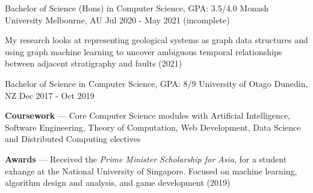 
\begin{cventries}
  \cventry
    {Bachelor of Science (Hons) in Computer Science, GPA: 3.5/4.0} %
    {Monash University} %
    {Melbourne, AU} %
    {Jul 2020 - May 2021 (incomplete)} %
    {
      \begin{cvitems} %
         \item {My research looks at representing geological systems as graph data structures and using graph machine learning to uncover ambiguous temporal relationships between adjacent stratigraphy and faults (2021)}
      \end{cvitems}
    }

  \cventry
    {Bachelor of Science in Computer Science, GPA: 8/9} %
    {University of Otago} %
    {Dunedin, NZ} %
    {Dec 2017 - Oct 2019} %
    {
      \begin{cvitems} %
         \item {\textbf{Coursework} --- Core Computer Science modules with Artificial Intelligence, Software Engineering, Theory of Computation, Web Development, Data Science and Distributed Computing electives}
         \item {\textbf{Awards} --- Received the \emph{Prime Minister Scholarship for Asia}, for a student exhange at the National University of Singapore. Focused on machine learning, algorithm design and analysis, and game development (2019)}
      \end{cvitems}
    }
\end{cventries}
